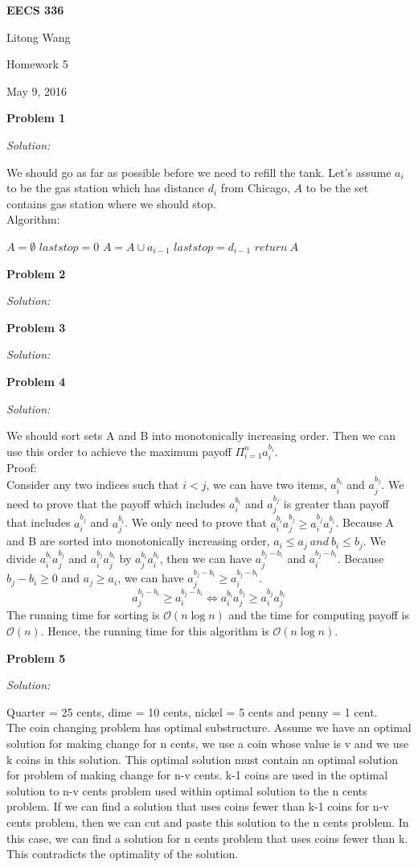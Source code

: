 \documentclass[12pt,letterpaper]{article}
\def\pp{\par\noindent}
\newcommand{\problem}[1]{ \bigskip \pp \textbf{Problem #1}\par}
\newcommand{\solution}{\textit{Solution:}\par}
\begin{document}
\centerline{\bf EECS 336}

\medskip
\centerline{Litong Wang}
\centerline{Homework 5}
\centerline{May 9, 2016}
\bigskip


\problem{1}
\solution
We should go as far as possible before we need to refill the tank. Let's assume $a_i$ to be the gas station which has distance $d_i$ from Chicago, $A$ to be the set contains gas station where we should stop. \\
Algorithm: \\
\begin{algorithm}[H]
$ A = \emptyset $ \;
$ laststop = 0 $ \;
{
  {
	$A = A \cup a_{i-1}$ \;
	$laststop = d_{i-1}$ \;
	}
}
   $return\  A$ \;
\end{algorithm}

\problem{2}
\solution

\problem{3}
\solution

\problem{4}
\solution
We should sort sets A and B into monotonically increasing order. Then we can use this order to achieve the maximum payoff $ \Pi _{i = 1}^{n} a_i^{b_i}$.\\
Proof: \\
Consider any two indices such that $i < j$, we can have two items, $a_i^{b_i}$ and $a_j^{b_j}$. We need to prove that the payoff which includes $a_i^{b_i}$ and $a_j^{b_j}$ is greater than payoff that includes $a_i^{b_j}$ and $a_j^{b_i}$. We only need to prove that $a_i^{b_i} a_j^{b_j} \ge a_i^{b_j} a_j^{b_i}$. Because A and B are sorted into monotonically increasing order, $a_i \le a_j\ and\ b_i \le b_j$. We divide $a_i^{b_i} a_j^{b_j}$ and $a_i^{b_j} a_j^{b_i}$ by $a_j^{b_i} a_i^{b_i}$, then we can have $a_j^{b_j - b_i}$ and $a_i^{b_j - b_i}$. Because $b_j - b_i \ge 0$ and $a_j \ge a_i$, we can have $a_j^{b_j - b_i} \ge a_i^{b_j - b_i}$.\\
$$a_j^{b_j - b_i} \ge a_i^{b_j - b_i} \Leftrightarrow a_i^{b_i} a_j^{b_j} \ge a_i^{b_j} a_j^{b_i}$$
The running time for sorting is $\mathcal{O}(n \log n)$ and the time for computing payoff is $\mathcal{O}(n)$. Hence, the running time for this algorithm is $\mathcal{O}(n \log n)$.

\problem{5}
\solution
Quarter = 25 cents, dime = 10 cents, nickel = 5 cents and penny = 1 cent. \\
The coin changing problem has optimal substructure. Assume we have an optimal solution for making change for n cents, we use a coin whose value is v and we use k coins in this solution. This optimal solution must contain an optimal solution for problem of making change for n-v cents. k-1 coins are used in the optimal solution to n-v cents problem used within optimal solution to the n cents problem. If we can find a solution that uses coins fewer than k-1 coins for n-v cents problem, then we can cut and paste this solution to the n cents problem. In this case, we can find a solution for n cents problem that uses coins fewer than k. This contradicts the optimality of the solution. \\
\end{document}
